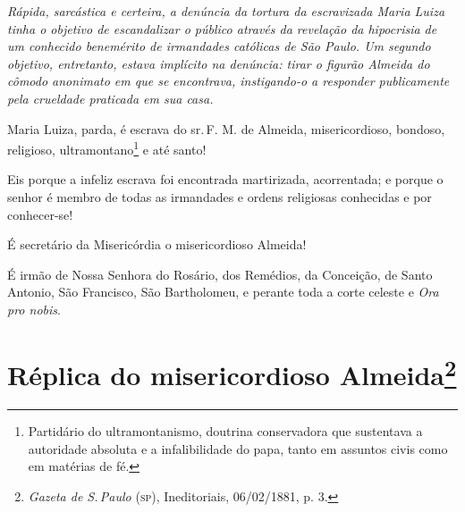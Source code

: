 
\begin{resumo}
\emph{Rápida, sarcástica e certeira, a denúncia da tortura da
escravizada Maria Luiza tinha o objetivo de escandalizar o público
através da revelação da hipocrisia de um conhecido benemérito de
irmandades católicas de São Paulo. Um segundo objetivo,
entretanto, estava implícito na denúncia: tirar o figurão Almeida do
cômodo anonimato em que se encontrava, instigando-o a responder
publicamente pela crueldade praticada em sua casa.}
\end{resumo}

Maria Luiza, parda, é escrava do sr.\,F. M. de Almeida, misericordioso,
bondoso, religioso, ultramontano\footnote{Partidário do
  ultramontanismo, doutrina conservadora que sustentava a autoridade
  absoluta e a infalibilidade do papa, tanto em assuntos civis como em
  matérias de fé.} e até
santo!

Eis porque a infeliz escrava foi encontrada martirizada, acorrentada; e
porque o senhor é membro de todas as irmandades e ordens religiosas
conhecidas e por conhecer-se!

É secretário da Misericórdia o misericordioso Almeida!

É irmão de Nossa Senhora do Rosário, dos Remédios, da Conceição, de
Santo Antonio, São Francisco, São Bartholomeu, e perante toda a corte
celeste e \emph{Ora pro nobis}.

\pagebreak
\section{Réplica do misericordioso Almeida\protect\footnote{
\emph{\MakeUppercase{G}azeta de \MakeUppercase{S}.\,\MakeUppercase{P}aulo} (\textsc{sp}), \MakeUppercase{I}neditoriais, 06/02/1881, p. 3.}}

